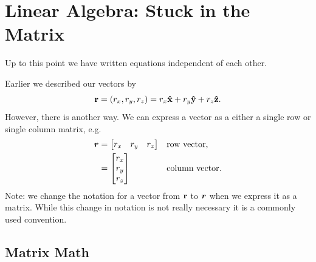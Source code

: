 \chapter{Linear Algebra: Stuck in the Matrix}

Up to this point we have written equations independent of each other.

Earlier we described our vectors by
\begin{equation}
    \vb{r} = (r_x,r_y,r_z) = r_x \vu{x} + r_y \vu{y} + r_z \vu{z} .
\end{equation}
However, there is another way.  We can express a vector as a either a single row
or single column matrix, e.g.
\begin{align}
    \bm{r} & = \begin{bmatrix}
            r_x & r_y & r_z
        \end{bmatrix} && \text{row vector} , \\
    & = \begin{bmatrix}
            r_x \\ r_y \\ r_z
        \end{bmatrix} && \text{column vector} . \\
\end{align}
Note: we change the notation for a vector from $\vb{r}$ to $\bm{r}$ when
we express it as a matrix.  While this change in notation is not really
necessary it is a commonly used convention.


\section{Matrix Math}

